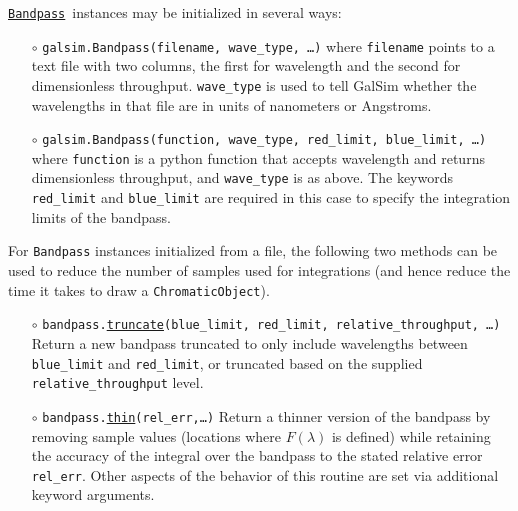 \documentclass[preprint,10pt]{../../devel/modules/aastex}
\newcommand\Bandpass{\href{http://galsim-developers.github.io/GalSim/classgalsim_1_1bandpass_1_1_bandpass.html}{\texttt{Bandpass}}}
\begin{document}
\Bandpass\ instances may be initialized in several ways:
\begin{itemize}
  \item[$\circ$]
  \texttt{galsim.Bandpass(filename, wave\_type, \dots)}
    \newline
    where \texttt{filename} points to a
    text file with two columns, the first for wavelength and the second for dimensionless
    throughput.  \texttt{wave\_type} is used to tell GalSim whether the wavelengths in that file are
    in units of nanometers or Angstroms.
  \item[$\circ$]
  \texttt{galsim.Bandpass(function, wave\_type, red\_limit, blue\_limit, \dots)}
    \newline
    where \texttt{function} is a python function that accepts wavelength and returns
    dimensionless throughput, and \texttt{wave\_type} is as above.
    The keywords \texttt{red\_limit} and \texttt{blue\_limit} are required in
    this case to specify the integration limits of the bandpass.
\end{itemize}

For \texttt{Bandpass} instances initialized from a file, the following two methods can be used to
reduce the number of samples used for integrations (and hence reduce the time it takes to draw
a \texttt{ChromaticObject}).
\begin{itemize}
  \item[$\circ$]
  \texttt{bandpass.\href{http://galsim-developers.github.io/GalSim/classgalsim_1_1bandpass_1_1_bandpass.html\#a230865a1e29ed8a95ea4b2c7d66a08a1}{truncate}(blue\_limit,
    red\_limit, relative\_throughput, \dots)}
    \newline
    Return a new bandpass truncated to only include wavelengths between \texttt{blue\_limit} and 
    \texttt{red\_limit}, or truncated based on the supplied \texttt{relative\_throughput} level.
  \item[$\circ$]
  \texttt{bandpass.\href{http://galsim-developers.github.io/GalSim/classgalsim_1_1bandpass_1_1_bandpass.html\#a20a7b1813506e7441e03ef097f0d5bf1}{thin}(rel\_err,\dots)}
    \newline
   Return a thinner version of the bandpass by removing sample values (locations where
   $F(\lambda)$ is defined) while retaining the
   accuracy of the integral over the bandpass to the stated relative error \texttt{rel\_err}.  Other
   aspects of the behavior of this routine are set via additional keyword arguments.
\end{itemize}
\end{document}

